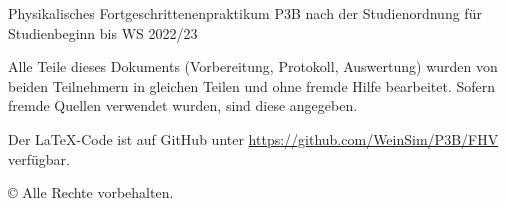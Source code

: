 \documentclass{article}
\title{\versuchsname}
\author{Simon Weinzierl, Yannic Werner}
\newcommand{\githuburl}{
    \url{https://github.com/WeinSim/P3B/FHV}
}
\begin{document}
\maketitle

\begin{center}
    Physikalisches Fortgeschrittenenpraktikum P3B
    nach der Studienordnung für Studienbeginn bis WS 2022/23
\end{center}

\vspace*{6cm}

\begin{center}
    \footnotesize
    Alle Teile dieses Dokuments (Vorbereitung, Protokoll, Auswertung) wurden
    von beiden Teilnehmern in gleichen Teilen und ohne fremde Hilfe bearbeitet.
    Sofern fremde Quellen verwendet wurden, sind diese angegeben.

    Der \LaTeX-Code ist auf GitHub unter \githuburl verfügbar.
    
    © Alle Rechte vorbehalten.
\end{center}


\newpage

\tableofcontents

\newpage



\end{document}
